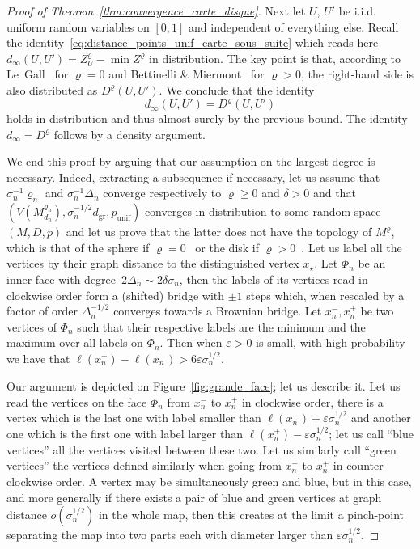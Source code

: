 \documentclass[10pt]{amsart}
\theoremstyle{definition}\newtheorem{defi}[theo]{Definition}\newtheorem{rema}[theo]{Remark}\newtheorem{exam}[theo]{Example}\newtheorem{exem}[theo]{Example}\newtheorem{nota}[theo]{Notation}
\newcommand{\1}{\ensembles{1}}
\renewcommand{\ge}{\geqslant}
\newcommand{\Bmap}{M}
\newcommand{\dBmap}{D}
\newcommand{\mn}{M_{d_n}^{\varrho_n}}
\newcommand{\dgr}{d_{\mathrm{gr}}}
\newcommand{\pgr}{p_{\mathrm{unif}}}
\providecommand{\?}{}
\begin{document}
\begin{proof}[Proof of Theorem~\ref{thm:convergence_carte_disque}]
Next let $U$, $U'$ be i.i.d. uniform random variables on $[0,1]$ and independent of everything else. Recall the identity~\eqref{eq:distance_points_unif_carte_sous_suite} which reads here $d_\infty(U,U') = Z^\varrho_U - \min Z^\varrho$ in distribution. The key point is that, according to Le~Gall~\cite[Corollary~7.3]{LG13} for $\varrho = 0$ and Bettinelli \& Miermont~\cite[Lemma~17 \& Corollary~21]{BM17} for $\varrho > 0$, the right-hand side is also distributed as $\dBmap^\varrho(U,U')$. We conclude that the identity
\[
d_\infty(U,U') = \dBmap^\varrho(U,U')
\]
holds in distribution and thus almost surely by the previous bound. The identity $d_\infty = \dBmap^\varrho$ follows by a density argument.



We end this proof by arguing that our assumption on the largest degree is necessary. Indeed, extracting a subsequence if necessary, let us assume that $\sigma_n^{-1} \varrho_n$ and $\sigma_n^{-1} \Delta_n$ converge respectively to $\varrho \ge 0$ and $\delta > 0$ and that $(V(\mn), \sigma_n^{-1/2} \dgr, \pgr)$ converges in distribution to some random space $(M, D, p)$ and let us prove that the latter does not have the topology of $\Bmap^\varrho$, which is that of the sphere if $\varrho = 0$~\cite{LGP08, Mie08} or the disk if $\varrho > 0$~\cite{Bet15}. Let us label all the vertices by their graph distance to the distinguished vertex $x_\star$. Let $\Phi_n$ be an inner face with degree~$2\Delta_n \sim 2 \delta \sigma_n$, then the labels of its vertices read in clockwise order form a (shifted) bridge with $\pm1$ steps which, when rescaled by a factor of order $\Delta_n^{-1/2}$ converges towards a Brownian bridge. Let $x_n^-, x_n^+$ be two vertices of $\Phi_n$ such that their respective labels are the minimum and the maximum over all labels on $\Phi_n$. Then when $\varepsilon > 0$ is small, with high probability we have that $\ell(x_n^+) - \ell(x_n^-) > 6 \varepsilon \sigma_n^{1/2}$.


Our argument is depicted on Figure~\ref{fig:grande_face}; let us describe it. Let us read the vertices on the face $\Phi_n$ from $x_n^-$ to $x_n^+$ in clockwise order, there is a vertex which is the last one with label smaller than $\ell(x_n^-) + \varepsilon \sigma_n^{1/2}$ and another one which is the first one with label larger than $\ell(x_n^+) - \varepsilon \sigma_n^{1/2}$; let us call ``blue vertices'' all the vertices visited between these two. Let us similarly call ``green vertices'' the vertices defined similarly when going from $x_n^-$ to $x_n^+$ in counter-clockwise order. A vertex may be simultaneously green and blue, but in this case, and more generally if there exists a pair of blue and green vertices at graph distance $o(\sigma_n^{1/2})$ in the whole map, then this creates at the limit a pinch-point separating the map into two parts each with diameter larger than $\varepsilon \sigma_n^{1/2}$.



\end{proof}
\end{document}
